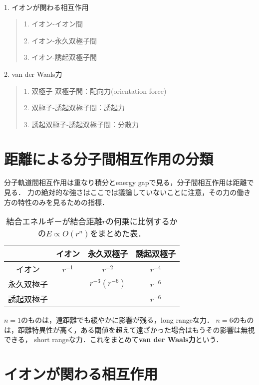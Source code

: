 \documentclass[uplatex, dvipdfmx]{jsreport}
\begin{document}
\begin{definition}[分子間の電磁気相互作用６種類]　

    1. イオンが関わる相互作用
    \begin{quotation}
        1. イオン-イオン間

        2. イオン-永久双極子間

        3. イオン-誘起双極子間
    \end{quotation}

    2. van der Waals力
    \begin{quotation}
        1. 双極子-双極子間：配向力(orientation force)

        2. 双極子-誘起双極子間：誘起力

        3. 誘起双極子-誘起双極子間：分散力
    \end{quotation}
\end{definition}

\section*{距離による分子間相互作用の分類}
分子軌道間相互作用は重なり積分とenergy gapで見る，分子間相互作用は距離で見る．
力の絶対的な強さはここでは議論していないことに注意，その力の働き方の特性のみを見るための指標．
\begin{center}
    \begin{table}[h]\centering\caption{結合エネルギーが結合距離$r$の何乗に比例するかの$E\propto O(r^n)$をまとめた表．}
        \begin{tabular}{|c|c|c|c|}\hline
            &イオン&永久双極子&誘起双極子\\\hline
            イオン&$r^{-1}$&$r^{-2}$&$r^{-4}$\\
            永久双極子&&$r^{-3}(r^{-6})$&$r^{-6}$\\
            誘起双極子&&&$r^{-6}$\\\hline
        \end{tabular}
    \end{table}
\end{center}
$n=1$のものは，遠距離でも緩やかに影響が残る，long rangeな力．
$n=6$のものは，距離特異性が高く，ある閾値を超えて遠ざかった場合はもうその影響は無視できる，
short rangeな力．これをまとめて\textbf{van der Waals力}という．

\section{イオンが関わる相互作用}
\end{document}
